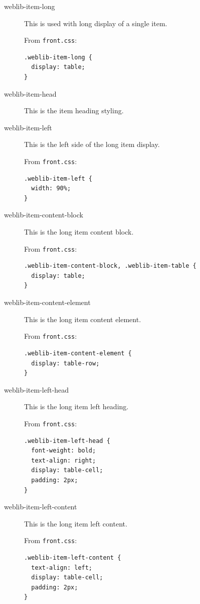 \documentclass[letterpaper,twoside]{article}
\begin{document}
\begin{description}
\item[weblib-item-long] This is used with long display of a single item.

From \texttt{front.css}:

\begin{verbatim}
.weblib-item-long {
  display: table;
}
\end{verbatim}

\item[weblib-item-head] This is the item heading styling.

\item[weblib-item-left] This is the left side of the long item display.

From \texttt{front.css}:

\begin{verbatim}
.weblib-item-left {
  width: 90%;
}
\end{verbatim}

\item[weblib-item-content-block] This is the long item content block.

From \texttt{front.css}:

\begin{verbatim}
.weblib-item-content-block, .weblib-item-table {
  display: table;
}
\end{verbatim}

\item[weblib-item-content-element] This is the long item content element.

From \texttt{front.css}:

\begin{verbatim}
.weblib-item-content-element {
  display: table-row;
}
\end{verbatim}

\item[weblib-item-left-head] This is the long item left heading.

From \texttt{front.css}:

\begin{verbatim}
.weblib-item-left-head {
  font-weight: bold;
  text-align: right;
  display: table-cell;
  padding: 2px;
}
\end{verbatim}

\item[weblib-item-left-content] This is the long item left content.

From \texttt{front.css}:

\begin{verbatim}
.weblib-item-left-content {
  text-align: left;
  display: table-cell;
  padding: 2px;
}
\end{verbatim}


\end{description}
\end{document}
